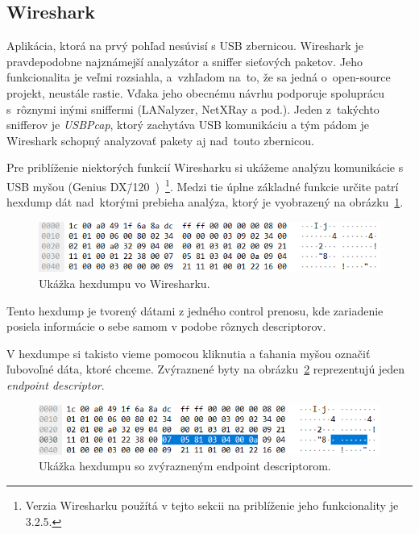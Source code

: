 \subsection*{Wireshark}
\label{uvod:sec:Wireshark}

Aplikácia, ktorá na prvý pohľad nesúvisí s USB zbernicou. Wireshark je pravdepodobne najznámejší analyzátor a sniffer sieťových paketov. Jeho funkcionalita je veľmi rozsiahla, a~vzhľadom na~to, že sa jedná o~open-source projekt, neustále rastie. Vďaka jeho obecnému návrhu podporuje spoluprácu s~rôznymi inými sniffermi (LANalyzer, NetXRay a pod.). Jeden z~takýchto snifferov je \textit{USBPcap}, ktorý zachytáva USB komunikáciu a tým pádom je Wireshark schopný analyzovať pakety aj nad~touto zbernicou. 

Pre priblíženie niektorých funkcií Wiresharku si ukážeme analýzu komunikácie s USB myšou (Genius DX\=/120~\cite{genius_mouse})~\footnote{Verzia Wiresharku použítá v tejto sekcii na priblíženie jeho funkcionality je 3.2.5.}. Medzi tie úplne základné funkcie určite patrí hexdump dát nad~ktorými prebieha analýza, ktorý je vyobrazený na obrázku~\ref{obr:uvod:wireshark_hexdump}. 

\begin{figure}[!htb]
	\centering
	\includegraphics[width=12cm]{img/uvod_wireshark_hexdump}
	\caption{Ukážka hexdumpu vo Wiresharku.}
	\label{obr:uvod:wireshark_hexdump}
\end{figure}


Tento hexdump je tvorený dátami z jedného control prenosu, kde zariadenie posiela informácie o sebe samom v podobe rôznych descriptorov. 

V hexdumpe si takisto vieme pomocou kliknutia a ťahania myšou označiť ľubovoľné dáta, ktoré chceme. Zvýraznené byty na obrázku~\ref{obr:uvod:wireshark_hexdump_endpoint} reprezentujú jeden \textit{endpoint descriptor}.

\begin{figure}[!htb]
	\centering
	\includegraphics[width=12cm]{img/uvod_wireshark_hexdump_endpoint}
	\caption{Ukážka hexdumpu so zvýrazneným endpoint descriptorom.}
	\label{obr:uvod:wireshark_hexdump_endpoint}
\end{figure}

